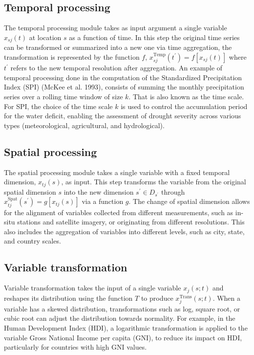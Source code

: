 \documentclass[
]{interact}
\begin{document}
\subsection{Temporal processing}\label{temporal-processing}

The temporal processing module takes as input argument a single variable
\(x_{sj}(t)\) at location \(s\) as a function of time. In this step the
original time series can be transformed or summarized into a new one via
time aggregation, the transformation is represented by the function
\(f\), \(x^{\text{Temp}}_{sj}(t^\prime) = f[x_{sj}(t)]\) where
\(t^\prime\) refers to the new temporal resolution after aggregation. An
example of temporal processing done in the computation of the
Standardized Precipitation Index (SPI) (McKee et al. 1993), consists of
summing the monthly precipitation series over a rolling time window of
size \(k\). That is also known as the time scale. For SPI, the choice of
the time scale \(k\) is used to control the accumulation period for the
water deficit, enabling the assessment of drought severity across
various types (meteorological, agricultural, and hydrological).

\subsection{Spatial processing}\label{spatial-processing}

The spatial processing module takes a single variable with a fixed
temporal dimension, \(x_{tj}(s)\), as input. This step transforms the
variable from the original spatial dimension \(s\) into the new
dimension \(s^\prime \in D_{s^\prime}\) through
\(x^{\text{Spat}}_{tj}(s^\prime) = g[x_{tj}(s)]\) via a function \(g\).
The change of spatial dimension allows for the alignment of variables
collected from different measurements, such as in-situ stations and
satellite imagery, or originating from different resolutions. This also
includes the aggregation of variables into different levels, such as
city, state, and country scales.

\subsection{Variable transformation}\label{variable-transformation}

Variable transformation takes the input of a single variable
\(x_j(s;t)\) and reshapes its distribution using the function \(T\) to
produce \(x^{\text{Trans}}_{j}(s;t)\). When a variable has a skewed
distribution, transformations such as log, square root, or cubic root
can adjust the distribution towards normality. For example, in the Human
Development Index (HDI), a logarithmic transformation is applied to the
variable Gross National Income per capita (GNI), to reduce its impact on
HDI, particularly for countries with high GNI values.
\end{document}
